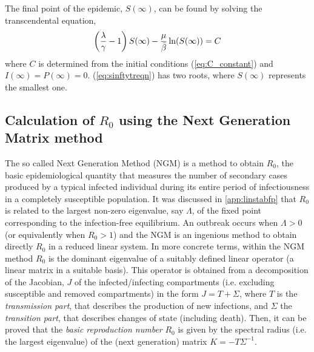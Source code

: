 The final point of the epidemic,  $S(\infty)$, can be found by solving the
transcendental equation,
\begin{equation}
    \left({{\lambda}\over{\gamma}}-1\right)S(\infty)
    -\frac{\mu}{\bar{\beta}}\ln (S(\infty))=C
    \label{eq:sinftytreqn}
\end{equation}
where $C$ is determined from the initial conditions (\cref{eq:C_constant})
and $I(\infty)=P(\infty)=0$.
(\cref{eq:sinftytreqn}) has two roots, where $S({\infty})$ represents the
smallest one.

\subsection{Calculation of $R_0$ using the Next Generation Matrix
    method}\label{app:NGM}

The so called Next Generation Method (NGM) is a method to obtain $R_0$, the
basic epidemiological quantity that measures the number of secondary cases
produced by a typical infected individual during its entire period of
infectiousness in a completely susceptible population. It was discussed in
\ref{app:linstabfp} that $R_0$ is related to the largest non-zero eigenvalue,
say $\Lambda$, of the fixed point corresponding to the infection-free
equilibrium. An outbreak occurs when $\Lambda>0$ (or equivalently when $R_0>1$)
and the NGM is an ingenious method to obtain directly $R_0$ in a reduced linear
system.
In more concrete terms, within the NGM method $R_0$ is the dominant eigenvalue
of a suitably defined linear operator (a linear matrix in a suitable basis).
This operator is obtained from a decomposition of the Jacobian, $J$ of
the infected/infecting compartments (i.e. excluding susceptible and removed
compartments) in the form $J=T+\Sigma$, where $T$ is
the
\textit{transmission part}, that describes the production of new infections,
and $\Sigma$  the \textit{transition part}, that describes changes of
state (including death). Then, it can be proved \cite{Diekmann2010} that the
\textit{basic reproduction number} $R_0$ is given by the spectral radius (i.e.
the largest eigenvalue) of the (next generation) matrix $K=- T
    \Sigma^{-1}$.

